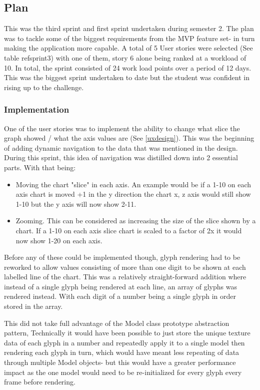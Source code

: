 \subsection{Plan}
This was the third sprint and first sprint undertaken during semester 2. The plan was to tackle some of the biggest requirements from the MVP feature set- in turn making the application more capable. A total of 5 User stories were selected (See table ref{sprint3}) with one of them, story 6 alone being ranked at a workload of 10. In total, the sprint consisted of 24 work load points over a period of 12 days. This was the biggest sprint undertaken to date but the student was confident in rising up to the challenge.

\subsubsection{Implementation}

One of the user stories was to implement the ability to change what slice the graph showed / what the axis values are (See \ref{uxdesign}). This was the beginning of adding dynamic navigation to the data that was mentioned in the design. During this sprint, this idea of navigation was distilled down into 2 essential parts. With that being:
\begin{itemize}
    \item Moving the chart "slice" in each axis. An example would be if a 1-10 on each axis chart is moved +1 in the y direction the chart x, z axis would still show 1-10 but the y axis will now show 2-11.
    \item Zooming. This can be considered as increasing the size of the slice shown by a chart. If a 1-10 on each axis slice chart is scaled to a factor of 2x it would now show 1-20 on each axis.
\end{itemize}

Before any of these could be implemented though, glyph rendering had to be reworked to allow values consisting of more than one digit to be shown at each labelled line of the chart. This was a relatively straight-forward addition where instead of a single glyph being rendered at each line, an array of glyphs was rendered instead. With each digit of a number being a single glyph in order stored in the array.

This did not take full advantage of the Model class prototype abstraction pattern, Technically it would have been possible to just store the unique texture data of each glyph in a number and repeatedly apply it to a single model then rendering each glyph in turn, which would have meant less repeating of data through multiple Model objects- but this would have a greater performance impact as the one model would need to be re-initialized for every glyph every frame before rendering.

